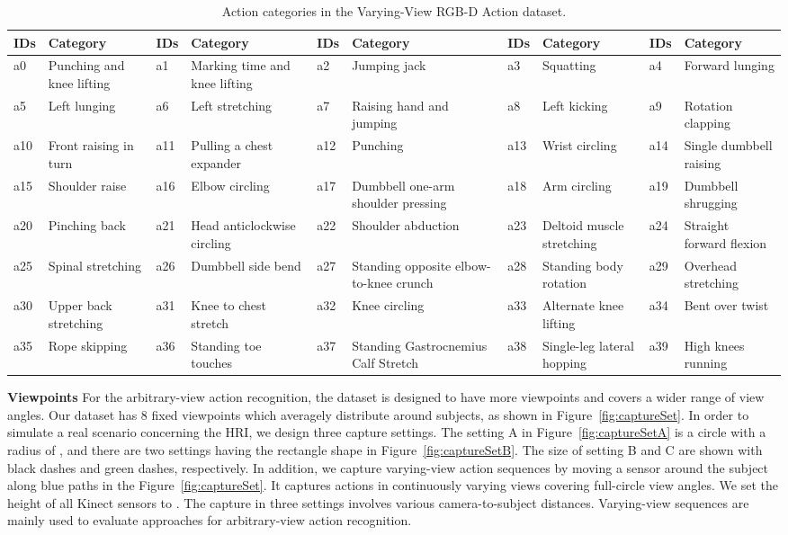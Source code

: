 \documentclass[journal]{IEEEtran}
\begin{document}
\begin{table*} \footnotesize
\begin{center}
\caption{Action categories in the Varying-View RGB-D Action dataset.}
\label{tab:category}
\begin{tabular}{|p{0.5cm}|p{2cm}|p{0.5cm}|p{2cm}|p{0.5cm}|p{2cm}|p{0.5cm}|p{2cm}|p{0.5cm}|p{2cm}|}
\hline
IDs & Category & IDs  & Category & IDs  & Category  & IDs  & Category  & IDs  & Category \\
\hline
 a0 & Punching and knee lifting & a1 & Marking time and knee lifting & a2 & Jumping jack  &  a3 & Squatting & a4 & Forward lunging \\
a5 & Left lunging & a6 & Left stretching  & a7 & Raising hand and jumping  & a8 & Left kicking  & a9  & Rotation clapping \\
a10 & Front raising in turn & a11 & Pulling a chest expander  & a12 & Punching  & a13 & Wrist circling  & a14 & Single dumbbell raising \\
a15 & Shoulder raise & a16 & Elbow circling  & a17 & Dumbbell one-arm shoulder pressing  & a18 & Arm circling  & a19 & Dumbbell shrugging \\
a20 & Pinching back & a21 & Head anticlockwise circling  & a22 & Shoulder abduction  & a23 & Deltoid muscle stretching  & a24 & Straight forward flexion \\
a25 & Spinal stretching & a26 & Dumbbell side bend  & a27 & Standing opposite elbow-to-knee crunch  & a28 & Standing body rotation  & a29 & Overhead stretching \\
a30 & Upper back stretching & a31 & Knee to chest stretch & a32 & Knee circling  & a33 & Alternate knee lifting  & a34 & Bent over twist \\
a35 & Rope skipping & a36 & Standing toe touches & a37 & Standing Gastrocnemius Calf Stretch & a38 & Single-leg lateral hopping  & a39 & High knees running \\
\hline
\end{tabular}
\end{center}
\end{table*}

\textbf{Viewpoints} For the arbitrary-view action recognition, the dataset is designed to have more viewpoints and covers a wider range of view angles. Our dataset has 8 fixed viewpoints which averagely distribute around subjects, as shown in Figure~\ref{fig:captureSet}.
In order to simulate a real scenario concerning the HRI, we design three capture settings. The setting A in Figure~\ref{fig:captureSetA} is a circle with a radius of , and there are two settings having the rectangle shape in Figure~\ref{fig:captureSetB}. The size of setting B and C are shown with black dashes and green dashes, respectively. In addition, we capture varying-view action sequences by moving a sensor around the subject along blue paths in the Figure~\ref{fig:captureSet}. It captures actions in continuously varying views covering  full-circle view angles. We set the height of all Kinect sensors to . The capture in three settings involves various camera-to-subject distances. Varying-view sequences are mainly used to evaluate approaches for arbitrary-view action recognition.
\end{document}
